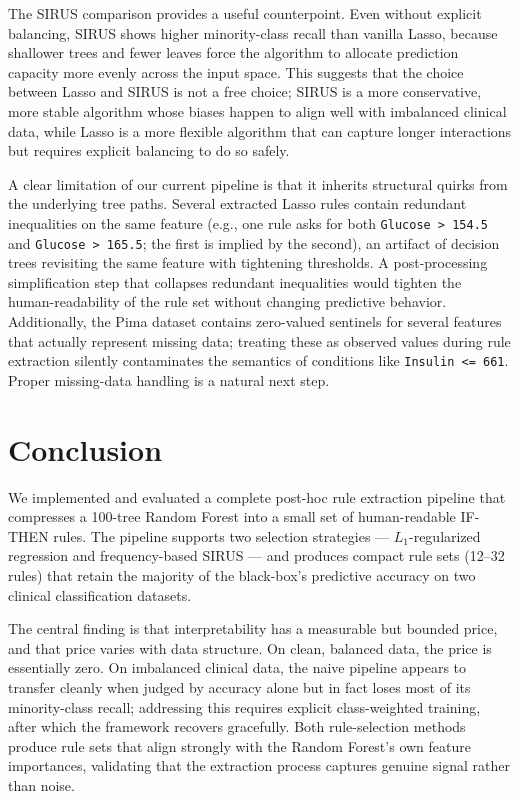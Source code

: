 \documentclass[11pt]{article}
\begin{document}
The SIRUS comparison provides a useful counterpoint. Even without explicit balancing, SIRUS shows higher minority-class recall than vanilla Lasso, because shallower trees and fewer leaves force the algorithm to allocate prediction capacity more evenly across the input space. This suggests that the choice between Lasso and SIRUS is not a free choice; SIRUS is a more conservative, more stable algorithm whose biases happen to align well with imbalanced clinical data, while Lasso is a more flexible algorithm that can capture longer interactions but requires explicit balancing to do so safely.

A clear limitation of our current pipeline is that it inherits structural quirks from the underlying tree paths. Several extracted Lasso rules contain redundant inequalities on the same feature (e.g., one rule asks for both \texttt{Glucose > 154.5} and \texttt{Glucose > 165.5}; the first is implied by the second), an artifact of decision trees revisiting the same feature with tightening thresholds. A post-processing simplification step that collapses redundant inequalities would tighten the human-readability of the rule set without changing predictive behavior. Additionally, the Pima dataset contains zero-valued sentinels for several features that actually represent missing data; treating these as observed values during rule extraction silently contaminates the semantics of conditions like \texttt{Insulin <= 661}. Proper missing-data handling is a natural next step.

\section{Conclusion}

We implemented and evaluated a complete post-hoc rule extraction pipeline that compresses a 100-tree Random Forest into a small set of human-readable IF-THEN rules. The pipeline supports two selection strategies --- $L_1$-regularized regression and frequency-based SIRUS --- and produces compact rule sets (12--32 rules) that retain the majority of the black-box's predictive accuracy on two clinical classification datasets.

The central finding is that interpretability has a measurable but bounded price, and that price varies with data structure. On clean, balanced data, the price is essentially zero. On imbalanced clinical data, the naive pipeline appears to transfer cleanly when judged by accuracy alone but in fact loses most of its minority-class recall; addressing this requires explicit class-weighted training, after which the framework recovers gracefully. Both rule-selection methods produce rule sets that align strongly with the Random Forest's own feature importances, validating that the extraction process captures genuine signal rather than noise.
\end{document}
